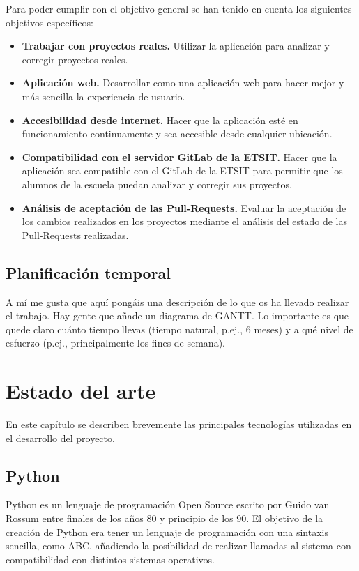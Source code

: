 \documentclass[a4paper, 12pt]{book}
\begin{document}
Para poder cumplir con el objetivo general se han tenido en cuenta los siguientes objetivos específicos:

\begin{itemize}
	\item \textbf{Trabajar con proyectos reales.} Utilizar la aplicación para analizar y corregir proyectos reales.
	\item \textbf{Aplicación web.} Desarrollar como una aplicación web para hacer mejor y más sencilla la experiencia de usuario.
	\item \textbf{Accesibilidad desde internet.} Hacer que la aplicación esté en funcionamiento continuamente y sea accesible desde cualquier ubicación.
	\item \textbf{Compatibilidad con el servidor GitLab de la ETSIT.} Hacer que la aplicación sea compatible con el GitLab de la ETSIT para permitir que los alumnos de la escuela puedan analizar y corregir sus proyectos.
	\item \textbf{Análisis de aceptación de las Pull-Requests.} Evaluar la aceptación de los cambios realizados en los proyectos mediante el análisis del estado de las Pull-Requests realizadas.
\end{itemize}


\section{Planificación temporal}
\label{sec:planificacion-temporal}
A mí me gusta que aquí pongáis una descripción de lo que os ha llevado realizar el trabajo.
Hay gente que añade un diagrama de GANTT.
Lo importante es que quede claro cuánto tiempo llevas (tiempo natural, p.ej., 6 meses) y a qué nivel de esfuerzo (p.ej., principalmente los fines de semana).



\cleardoublepage
\chapter{Estado del arte}
\label{chap:estado}

En este capítulo se describen brevemente las principales tecnologías utilizadas en el desarrollo del proyecto.

\section{Python} 
\label{sec:python}
Python \cite{python} es un lenguaje de programación Open Source escrito por Guido van Rossum entre finales de los años 80 y principio de los 90. El objetivo de la creación de Python era tener un lenguaje de programación con una sintaxis sencilla, como ABC, añadiendo la posibilidad de realizar llamadas al sistema con compatibilidad con distintos sistemas operativos.
\end{document}
